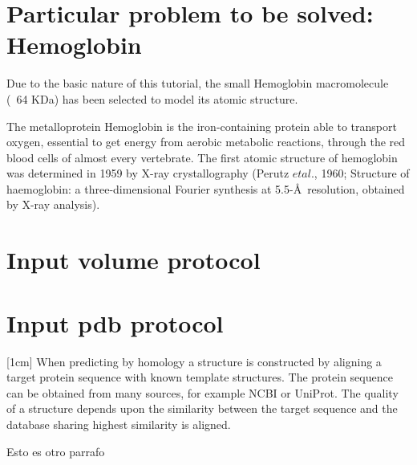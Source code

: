 \documentclass[12pt]{article} %
\begin{document}
\section{Particular problem to be solved: Hemoglobin}
Due to the basic nature of this tutorial, the small Hemoglobin macromolecule (~64 KDa) has been selected to model its atomic structure. 

The metalloprotein Hemoglobin is the iron-containing protein able to transport oxygen, essential to get energy from aerobic metabolic reactions, through the red blood cells of almost every vertebrate. The first atomic structure of hemoglobin was determined in 1959 by X-ray crystallography (Perutz $et al.$, 1960; Structure of haemoglobin: a three-dimensional Fourier synthesis at 5.5-\AA\ resolution, obtained by X-ray analysis).

\begin{appendices}
\section{Input volume protocol}

\section{Input pdb protocol}


[1cm]
When predicting by homology a structure is constructed by aligning a target protein sequence with known template structures. The protein sequence can be obtained from many sources, for example NCBI or UniProt. The quality of a structure depends upon the similarity between the target sequence and the database sharing highest similarity is aligned. 

Esto es otro parrafo


\end{appendices}
\end{document}
